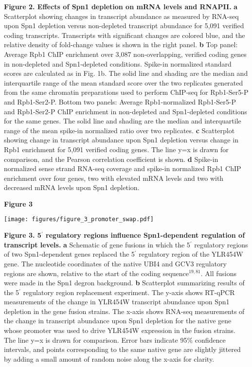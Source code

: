 \documentclass[8pt]{extarticle}
\begin{document}
\vspace{2em}
\textbf{Figure 2. Effects of Spn1 depletion on mRNA levels and RNAPII.}
\textbf{a} Scatterplot showing changes in transcript abundance as measured by RNA-seq upon Spn1 depletion versus non-depleted transcript abundance for 5,091 verified coding transcripts.
Transcripts with significant changes are colored blue, and the relative density of fold-change values is shown in the right panel.
\textbf{b} Top panel: Average Rpb1 ChIP enrichment over 3,087 non-overlapping, verified coding genes in non-depleted and Spn1-depleted conditions.
Spike-in normalized standard scores are calculated as in Fig. 1b.
The solid line and shading are the median and interquartile range of the mean standard score over the two replicates generated from the same chromatin preparations used to perform ChIP-seq for Rpb1-Ser5-P and Rpb1-Ser2-P.
Bottom two panels: Average Rpb1-normalized Rpb1-Ser5-P and Rpb1-Ser2-P ChIP enrichment in non-depleted and Spn1-depleted conditions for the same genes.
The solid line and shading are the median and interquartile range of the mean spike-in normalized ratio over two replicates.
\textbf{c} Scatterplot showing change in transcript abundance upon Spn1 depletion versus change in Rpb1 enrichment for 5,091 verified coding genes.
The line y=x is drawn for comparison, and the Pearson correlation coefficient is shown.
\textbf{d} Spike-in normalized sense strand RNA-seq coverage and spike-in normalized Rpb1 ChIP enrichment over four genes, two with elevated mRNA levels and two with decreased mRNA levels upon Spn1 depletion.

\newpage

\textbf{\large Figure 3}

\texttt{[image: figures/figure\_3\_promoter\_swap.pdf]}

\vspace{2em}
\textbf{Figure 3. 5$^\prime$ regulatory regions influence Spn1-dependent regulation of transcript levels.}
\textbf{a} Schematic of gene fusions in which the 5$^\prime$ regulatory regions of two Spn1-dependent genes replaced the 5$^\prime$ regulatory region of the YLR454W gene.
The nucleotide coordinates of the native UBI4 and GCV3 regulatory regions are shown, relative to the start of the coding sequence$^{19,81}$.
All fusions were made in the Spn1 degron background.
\textbf{b} Scatterplot summarizing results of the 5$^\prime$ regulatory region replacement experiment.
The y-axis shows RT-qPCR measurements of the change in YLR454W transcript abundance upon Spn1 depletion in the gene fusion strains.
The x-axis shows RNA-seq measurements of the change in transcript abundance upon Spn1 depletion for the native gene whose promoter was used to drive YLR454W expression in the fusion strains.
The line y=x is drawn for comparison.
Error bars indicate 95\% confidence intervals, and points corresponding to the same native gene are slightly jittered by adding a small amount of random noise along the x-axis for clarity.
\end{document}
